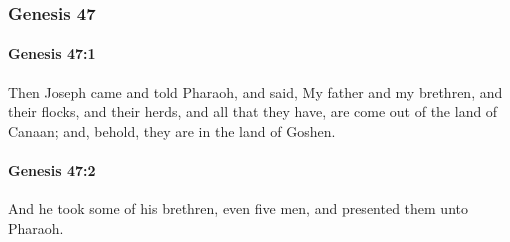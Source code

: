	\subsubsection{Genesis 47} %
		\label{GENESIS-47}

		\paragraph{Genesis 47:1} %
			\label{GENESIS-47-1}

			Then Joseph came and told Pharaoh, and said, My father and my brethren, and their flocks, and their herds, and all that they have, are come out of the land of Canaan; and, behold, they are in the land of Goshen.


		\paragraph{Genesis 47:2} %
			\label{GENESIS-47-2}

			And he took some of his brethren, even five men, and presented them unto Pharaoh.


